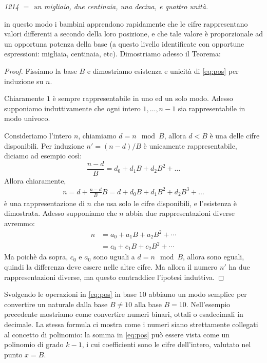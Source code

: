 {\it 1214 $ = $ un migliaio, due centinaia, una decina, e quattro unità.}

\noindent in questo modo i bambini apprendono rapidamente che le cifre
rappresentano valori differenti a secondo della loro posizione, e che tale
valore è proporzionale ad un opportuna potenza della base (a questo livello
identificate con opportune espressioni: migliaia, centinaia, etc). Dimostriamo
adesso il Teorema:

\begin{proof}%
Fissiamo la base $B$ e dimostriamo esistenza e unicità di \eqref{eq:pos} per induzione su $n$.

Chiaramente $1$ è sempre rappresentabile in uno ed un solo modo\footnotemark. Adesso supponiamo induttivamente che ogni intero
$1,\ldots,n-1$ sia rappresentabile in modo univoco.

\noindent Consideriamo l'intero $n$, chiamiamo $d = n \mod B$, allora $d < B$ è una delle cifre disponibili. Per induzione $n' = (n-d)/B$ è unicamente rappresentabile, diciamo ad esempio così:
\[ \frac{n-d}{B} = d_0 + d_1 B + d_2 B^2 + \ldots \]
Allora chiaramente,
\begin{align*}
n = d + \frac{n-d}{B}B = d + d_0 B + d_1 B^2 + d_2 B^3 + \ldots
\end{align*}
è una rappresentazione di $n$ che usa solo le cifre disponibili, e l'esistenza è dimostrata.
Adesso supponiamo che $n$ abbia due rappresentazioni diverse avremmo:
\begin{align*}
n &= a_0 + a_1B + a_2B^2 + \cdots\\
  &= c_0 + c_1B + c_2B^2 + \cdots
\end{align*}
Ma poichè da sopra, $c_0$ e $a_0$ sono uguali a $d = n \mod B$, allora sono eguali, quindi la differenza deve essere nelle altre cifre. Ma allora il numero $n'$ ha due rappresentazioni diverse, ma questo
contraddice l'ipotesi induttiva.
\end{proof}

Svolgendo le operazioni in \eqref{eq:pos} in base $10$ abbiamo un modo semplice
per convertire un naturale dalla base $B \neq 10$ alla base $B = 10$.
Nell'esempio precedente mostriamo come convertire numeri binari, ottali o
esadecimali in decimale. La stessa formula ci mostra come i numeri siano
strettamente collegati al concetto di polinomio: la somma in \eqref{eq:pos} può
essere vista come un polinomio di grado $k-1$, i cui coefficienti sono le cifre
dell'intero, valutato nel punto $x = B$.

